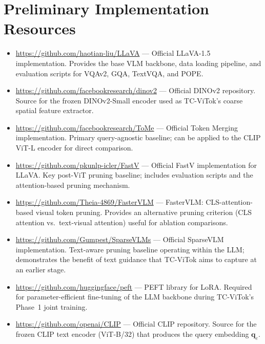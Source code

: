 \documentclass[11pt,twocolumn]{article}
\begin{document}
\section{Preliminary Implementation Resources}
\label{sec:resources}

\begin{itemize}[leftmargin=*, itemsep=2pt]

    \item \url{https://github.com/haotian-liu/LLaVA} ---
          Official LLaVA-1.5 implementation. Provides the base VLM backbone, data loading pipeline, and evaluation scripts for VQAv2, GQA, TextVQA, and POPE.

    \item \url{https://github.com/facebookresearch/dinov2} ---
          Official DINOv2 repository. Source for the frozen DINOv2-Small encoder used as TC-ViTok's coarse spatial feature extractor.

    \item \url{https://github.com/facebookresearch/ToMe} ---
          Official Token Merging implementation. Primary query-agnostic baseline; can be applied to the CLIP ViT-L encoder for direct comparison.

    \item \url{https://github.com/pkunlp-icler/FastV} ---
          Official FastV implementation for LLaVA. Key post-ViT pruning baseline; includes evaluation scripts and the attention-based pruning mechanism.

    \item \url{https://github.com/Theia-4869/FasterVLM} ---
          FasterVLM: CLS-attention-based visual token pruning. Provides an alternative pruning criterion (CLS attention vs.\ text-visual attention) useful for ablation comparisons.

    \item \url{https://github.com/Gumpest/SparseVLMs} ---
          Official SparseVLM implementation. Text-aware pruning baseline operating within the LLM; demonstrates the benefit of text guidance that TC-ViTok aims to capture at an earlier stage.

    \item \url{https://github.com/huggingface/peft} ---
          PEFT library for LoRA. Required for parameter-efficient fine-tuning of the LLM backbone during TC-ViTok's Phase~1 joint training.

    \item \url{https://github.com/openai/CLIP} ---
          Official CLIP repository. Source for the frozen CLIP text encoder (ViT-B/32) that produces the query embedding $\mathbf{q}_e$.

\end{itemize}
\end{document}
